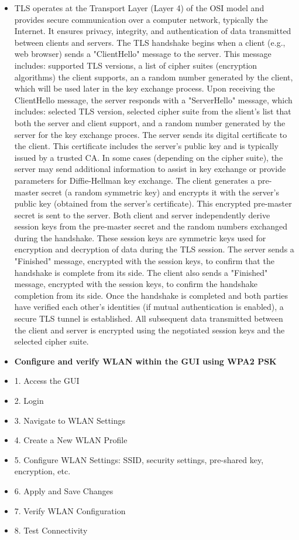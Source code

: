 \documentclass{article}
\begin{document}
\begin{itemize}
  	\item[] TLS operates at the Transport Layer (Layer 4) of the OSI model and provides secure communication over a computer network, typically the Internet. It ensures privacy, integrity, and authentication of data transmitted between clients and servers. The TLS handshake begins when a client (e.g., web browser) sends a "ClientHello" message to the server. This message includes: supported TLS versions, a list of cipher suites (encryption algorithms) the client supports, an a random number generated by the client, which will be used later in the key exchange process. Upon receiving the ClientHello message, the server responds with a "ServerHello" message, which includes: selected TLS version, selected cipher suite from the slient's list that both the server and client support, and a random number generated by the server for the key exchange proces. The server sends its digital certificate to the client. This certificate includes the server's public key and is typically issued by a trusted CA. In some cases (depending on the cipher suite), the server may send additional information to assist in key exchange or provide parameters for Diffie-Hellman key exchange. The client generates a pre-master secret (a random symmetric key) and encrypts it with the server's public key (obtained from the server's certificate). This encrypted pre-master secret is sent to the server. Both client and server independently derive session keys from the pre-master secret and the random numbers exchanged during the handshake. These session keys are symmetric keys used for encryption and decryption of data during the TLS session. The server sends a "Finished" message, encrypted with the session keys, to confirm that the handshake is complete from its side. The client also sends a "Finished" message, encrypted with the session keys, to confirm the handshake completion from its side. Once the handshake is completed and both parties have verified each other's identities (if mutual authentication is enabled), a secure TLS tunnel is established. All subsequent data transmitted between the client and server is encrypted using the negotiated session keys and the selected cipher suite.
  
  \item \textbf{Configure and verify WLAN within the GUI using WPA2 PSK}
	\item[] 1. Access the GUI
	\item[] 2. Login
	\item[] 3. Navigate to WLAN Settings
	\item[] 4. Create a New WLAN Profile
	\item[] 5. Configure WLAN Settings: SSID, security settings, pre-shared key, encryption, etc.
	\item[] 6. Apply and Save Changes
	\item[] 7. Verify WLAN Configuration
	\item[] 8. Test Connectivity

\end{itemize}
\end{document}
